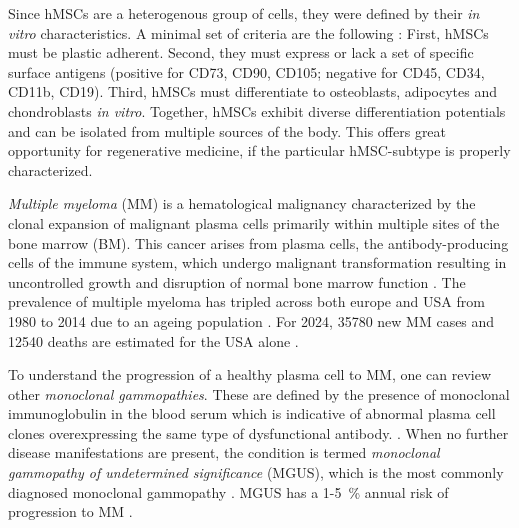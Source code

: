 Since hMSCs are a heterogenous group of cells, they were defined by their
\textit{in vitro} characteristics. A minimal set of criteria are the following
\cite{dominiciMinimalCriteriaDefining2006}: First, hMSCs must be plastic
adherent. Second, they must express or lack a set of specific surface antigens
(positive for CD73, CD90, CD105; negative for CD45, CD34, CD11b, CD19). Third,
hMSCs must differentiate to osteoblasts, adipocytes and chondroblasts \textit{in
    vitro}. Together, hMSCs exhibit diverse differentiation potentials and can be
isolated from multiple sources of the body. This offers great opportunity for
regenerative medicine, if the particular hMSC-subtype is properly characterized.





%
\label{sec:intro_myeloma}%
\emph{Multiple myeloma} (MM) is a hematological malignancy characterized by the
clonal expansion of malignant plasma cells primarily within multiple sites of
the bone marrow (BM). This cancer arises from plasma cells, the
antibody-producing cells of the immune system, which undergo malignant
transformation resulting in uncontrolled growth and disruption of normal bone
marrow function \cite{yangPathogenesisTreatmentMultiple2022}. The prevalence of
multiple myeloma has tripled across both europe and USA from 1980 to 2014 due to
an ageing population \cite{ociasTrendsHematologicalCancer2016,
    turessonRapidlyChangingMyeloma2018}. For 2024, 35780 new MM cases and 12540
deaths are estimated for the USA alone \cite{siegelCancerStatistics20242024}.

To understand the progression of a healthy plasma cell to MM, one can review
other \emph{monoclonal gammopathies}. These are defined by the presence of
monoclonal immunoglobulin in the blood serum which is indicative of abnormal
plasma cell clones overexpressing the same type of dysfunctional antibody.
\cite{kyleMonoclonalGammopathyUndetermined1997,
    fermandMonoclonalGammopathyClinical2018}. When no further disease manifestations
are present, the condition is termed \emph{monoclonal gammopathy of undetermined
    significance} (MGUS), which is the most commonly diagnosed monoclonal gammopathy
\cite{kyleMonoclonalGammopathyUndetermined1997}. MGUS has a 1-\SI{5}{\percent}
annual risk of progression to MM \cite{rajkumarInternationalMyelomaWorking2014}.

